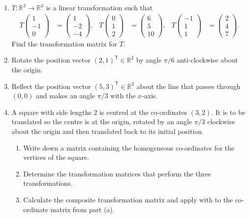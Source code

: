 \documentclass[a4paper,11pt]{article}
\begin{document}
\begin{enumerate}[label=6.\arabic*]
    \item $T: \mathbb{R}^3 \to \mathbb{R}^3$ is a linear transformation such that
    \begin{align*}
        T\begin{pmatrix} 1 \\ -1 \\ 0 \end{pmatrix} &= \begin{pmatrix} 1 \\ -2 \\ -4 \end{pmatrix}, &
        T\begin{pmatrix} 0 \\ 1 \\ 2 \end{pmatrix} &= \begin{pmatrix} 6 \\ 5 \\ 10 \end{pmatrix}, &
        T\begin{pmatrix} -1 \\ 1 \\ 1 \end{pmatrix} &= \begin{pmatrix} 2 \\ 4 \\ 7 \end{pmatrix}.
    \end{align*}
    Find the transformation matrix for $T$.

    \item Rotate the position vector $(2, 1)^\mathsf{T} \in \mathbb{R}^2$ by angle $\pi/6$ anti-clockwise about the origin.
    
    \item Reflect the position vector $(5, 3)^\mathsf{T} \in \mathbb{R}^2$ about the line that passes through $(0, 0)$ and makes an angle $\pi/3$ with the $x$-axis.
    
    \item A square with side lengths 2 is centred at the co-ordinates $(3, 2)$. It is to be translated so the centre is at the origin, rotated by an angle $\pi/3$ clockwise about the origin and then translated back to its initial position. 
    \begin{enumerate}
        \item Write down a matrix containing the homogeneous co-ordinates for the vertices of the square.
        \item Determine the transformation matrices that perform the three transformations.
        \item Calculate the composite transformation matrix and apply with to the co-ordinate matrix from part (a).
    \end{enumerate}
\end{enumerate}
\end{document}
